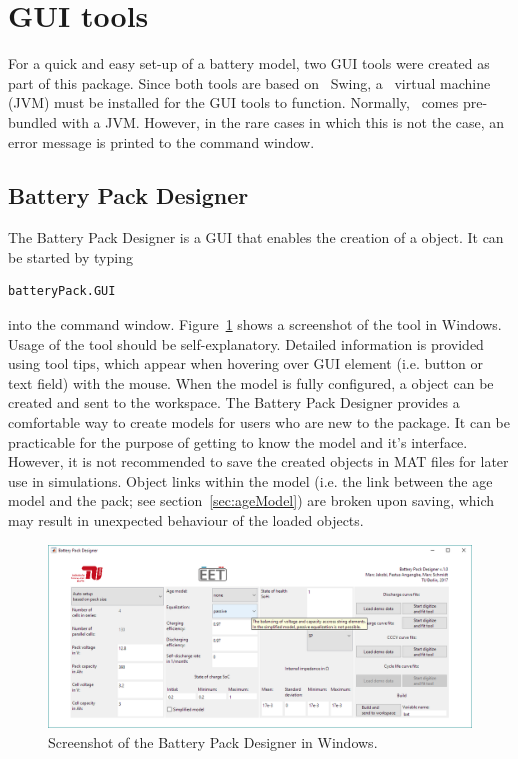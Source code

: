 \section{GUI tools}
For a quick and easy set-up of a battery model, two GUI tools were created as part of this package. Since both tools are based on \java\ Swing, a \java\ virtual machine (JVM) must be installed for the GUI tools to function. Normally, \matlab\ comes pre-bundled with a JVM. However, in the rare cases in which this is not the case, an error message is printed to the command window.

\subsection{Battery Pack Designer}
The Battery Pack Designer is a GUI that enables the creation of a  object. It can be started by typing
\begin{lstlisting}
batteryPack.GUI
\end{lstlisting}
into the command window. Figure~\ref{fig:Designer} shows a screenshot of the tool in Windows. Usage of the tool should be self-explanatory. Detailed information is provided using tool tips, which appear when hovering over GUI element (i.e. button or text field) with the mouse. When the model is fully configured, a  object can be created and sent to the workspace. The Battery Pack Designer provides a comfortable way to create models for users who are new to the package. It can be practicable for the purpose of getting to know the model and it's interface. \\
However, it is not recommended to save the created objects in MAT files for later use in simulations. Object links within the model (i.e. the link between the age model and the pack; see section~\ref{sec:ageModel}) are broken upon saving, which may result in unexpected behaviour of the loaded objects. 
\begin{figure}[b!]
	\captionsetup{type=figure}
	\centering
	\includegraphics[width=\textwidth]{Designer.png}
	\caption[Screenshot of the Battery Pack Designer in Windows]{Screenshot of the Battery Pack Designer in Windows.}
	\label{fig:Designer}
\end{figure}
